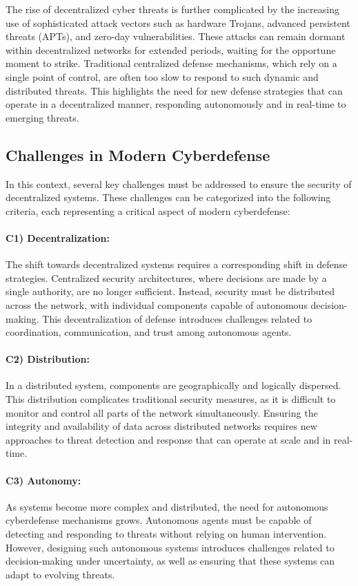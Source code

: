 The rise of decentralized cyber threats is further complicated by the increasing use of sophisticated attack vectors such as hardware Trojans, advanced persistent threats (APTs), and zero-day vulnerabilities. These attacks can remain dormant within decentralized networks for extended periods, waiting for the opportune moment to strike. Traditional centralized defense mechanisms, which rely on a single point of control, are often too slow to respond to such dynamic and distributed threats. This highlights the need for new defense strategies that can operate in a decentralized manner, responding autonomously and in real-time to emerging threats.

\subsection{Challenges in Modern Cyberdefense}

In this context, several key challenges must be addressed to ensure the security of decentralized systems. These challenges can be categorized into the following criteria, each representing a critical aspect of modern cyberdefense:

\paragraph{C1) Decentralization:}
The shift towards decentralized systems requires a corresponding shift in defense strategies. Centralized security architectures, where decisions are made by a single authority, are no longer sufficient. Instead, security must be distributed across the network, with individual components capable of autonomous decision-making. This decentralization of defense introduces challenges related to coordination, communication, and trust among autonomous agents.

\paragraph{C2) Distribution:}
In a distributed system, components are geographically and logically dispersed. This distribution complicates traditional security measures, as it is difficult to monitor and control all parts of the network simultaneously. Ensuring the integrity and availability of data across distributed networks requires new approaches to threat detection and response that can operate at scale and in real-time.

\paragraph{C3) Autonomy:}
As systems become more complex and distributed, the need for autonomous cyberdefense mechanisms grows. Autonomous agents must be capable of detecting and responding to threats without relying on human intervention. However, designing such autonomous systems introduces challenges related to decision-making under uncertainty, as well as ensuring that these systems can adapt to evolving threats.

